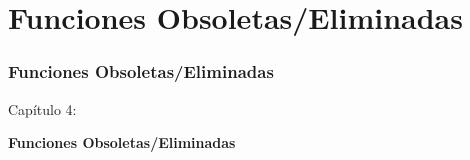 %

\section{Funciones Obsoletas/Eliminadas}
\begin{frame}[fragile]
	\frametitle{Funciones Obsoletas/Eliminadas}

	\begin{center}\huge{Capítulo 4:}\end{center}
	\begin{center}\huge{\color{typo3darkgrey}\textbf{Funciones Obsoletas/Eliminadas}}\end{center}

\end{frame}


